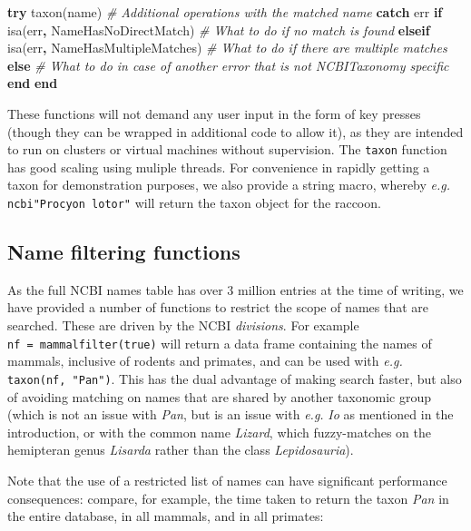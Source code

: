 \documentclass[10pt,oneside]{article}
\newenvironment{Shaded}{\begin{snugshade}}{\end{snugshade}}
\newcommand{\KeywordTok}[1]{\textcolor[rgb]{0.13,0.29,0.53}{\textbf{#1}}}
\newcommand{\CommentTok}[1]{\textcolor[rgb]{0.56,0.35,0.01}{\textit{#1}}}
\newcommand{\OperatorTok}[1]{\textcolor[rgb]{0.81,0.36,0.00}{\textbf{#1}}}
\newcommand{\NormalTok}[1]{#1}
\begin{document}
\begin{Shaded}
\begin{Highlighting}[]
\KeywordTok{try}
\NormalTok{  taxon(name)}
  \CommentTok{\# Additional operations with the matched name}
\KeywordTok{catch}\NormalTok{ err}
  \KeywordTok{if}\NormalTok{ isa(err}\OperatorTok{,}\NormalTok{ NameHasNoDirectMatch)}
    \CommentTok{\# What to do if no match is found}
  \KeywordTok{elseif}\NormalTok{ isa(err}\OperatorTok{,}\NormalTok{ NameHasMultipleMatches)}
    \CommentTok{\# What to do if there are multiple matches}
  \KeywordTok{else}
    \CommentTok{\# What to do in case of another error that is not NCBITaxonomy specific}
  \KeywordTok{end}
\KeywordTok{end}
\end{Highlighting}
\end{Shaded}

These functions will not demand any user input in the form of key
presses (though they can be wrapped in additional code to allow it), as
they are intended to run on clusters or virtual machines without
supervision. The \texttt{taxon} function has good scaling using muliple
threads. For convenience in rapidly getting a taxon for demonstration
purposes, we also provide a string macro, whereby \emph{e.g.}
\texttt{ncbi"Procyon\ lotor"} will return the taxon object for the
raccoon.

\hypertarget{name-filtering-functions}{%
\subsection{Name filtering functions}\label{name-filtering-functions}}

As the full NCBI names table has over 3 million entries at the time of
writing, we have provided a number of functions to restrict the scope of
names that are searched. These are driven by the NCBI \emph{divisions}.
For example \texttt{nf\ =\ mammalfilter(true)} will return a data frame
containing the names of mammals, inclusive of rodents and primates, and
can be used with \emph{e.g.} \texttt{taxon(nf,\ "Pan")}. This has the
dual advantage of making search faster, but also of avoiding matching on
names that are shared by another taxonomic group (which is not an issue
with \emph{Pan}, but is an issue with \emph{e.g.} \emph{Io} as mentioned
in the introduction, or with the common name \emph{Lizard}, which
fuzzy-matches on the hemipteran genus \emph{Lisarda} rather than the
class \emph{Lepidosauria}).

Note that the use of a restricted list of names can have significant
performance consequences: compare, for example, the time taken to return
the taxon \emph{Pan} in the entire database, in all mammals, and in all
primates:
\end{document}
